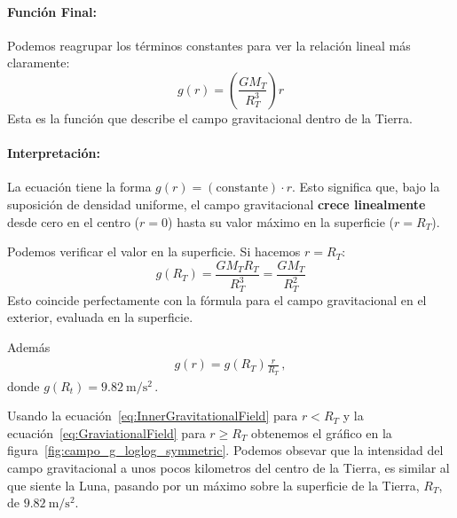 \documentclass[11pt,a4paper]{book}
\begin{document}
\paragraph{Función Final:}
Podemos reagrupar los términos constantes para ver la relación lineal más claramente:
\[ \boxed{g(r) = \left( \frac{G M_T}{R_T^3} \right) r} \]
Esta es la función que describe el campo gravitacional dentro de la Tierra.

\paragraph{Interpretación:}
La ecuación tiene la forma $g(r) = (\text{constante}) \cdot r$. Esto significa que, bajo la suposición de densidad uniforme, el campo gravitacional \textbf{crece linealmente} desde cero en el centro ($r=0$) hasta su valor máximo en la superficie ($r=R_T$).

Podemos verificar el valor en la superficie. Si hacemos $r=R_T$:
\[ g(R_T) = \frac{G M_T R_T}{R_T^3} = \frac{G M_T}{R_T^2} \]
Esto coincide perfectamente con la fórmula para el campo gravitacional en el exterior, evaluada en la superficie.

Además
\begin{align}
\label{eq:InnerGravitationalField}
    g(r) = g(R_T)\frac{r}{R_T}\,,
\end{align}
donde $g(R_t) = \qty{9.82}{\m/\s^2}$\,.

Usando la ecuación~\ref{eq:InnerGravitationalField} para $r<R_T$ y la ecuación~\ref{eq:GraviationalField} para $r\ge R_T$ obtenemos el gráfico en la figura~\ref{fig:campo_g_loglog_symmetric}. Podemos obsevar que la intensidad del campo gravitacional a unos pocos kilometros del centro de la Tierra, es similar al que siente la Luna, pasando por un máximo sobre la superficie de la Tierra, $R_T$, de $\qty{9.82}{\m/\s^2}$.

\end{document}
